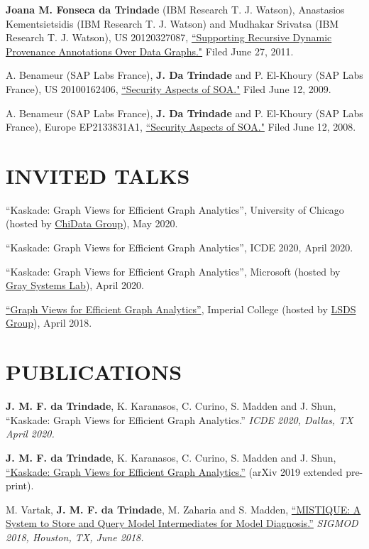 \documentclass[line,margin]{res}
\begin{document}
\begin{resume}
\textbf{Joana M. Fonseca da Trindade} (IBM Research T. J. Watson), Anastasios Kementsietsidis (IBM Research T. J. Watson) and Mudhakar Srivatsa (IBM Research T. J. Watson), US 20120327087, \href{http://www.faqs.org/patents/app/20120327087}{``Supporting Recursive Dynamic Provenance Annotations Over Data Graphs."} Filed June 27, 2011.

A. Benameur (SAP Labs France), \textbf{J. Da Trindade} and P. El-Khoury (SAP Labs France), US 20100162406, \href{http://www.faqs.org/patents/app/20100162406}{``Security Aspects of SOA."}  Filed June 12, 2009.

A. Benameur (SAP Labs France), \textbf{J. Da Trindade} and P. El-Khoury (SAP Labs France), Europe EP2133831A1, \href{http://www.freepatentsonline.com/EP2133831B1.html}{``Security Aspects of SOA."}  Filed June 12, 2008.


\section{INVITED TALKS}
``Kaskade: Graph Views for Efficient Graph Analytics'', University of Chicago (hosted by \href{https://data.cs.uchicago.edu/}{ChiData Group}), May 2020.

``Kaskade: Graph Views for Efficient Graph Analytics'', ICDE 2020, April 2020.

``Kaskade: Graph Views for Efficient Graph Analytics'', Microsoft (hosted by \href{https://azuredata.microsoft.com}{Gray Systems Lab}), April 2020.

\href{http://lsds.doc.ic.ac.uk/content/graph-views-efficient-graph-analytics-collaboration-microsoft-cisl}{``Graph Views for Efficient Graph Analytics''}, Imperial College (hosted by \href{https://lsds.doi.ic.ac.uk}{LSDS Group}), April 2018.


\section{PUBLICATIONS}
\textbf{J. M. F. da Trindade}, K. Karanasos, C. Curino, S. Madden and J. Shun, ``Kaskade: Graph Views for Efficient Graph Analytics.'' \textit{ICDE 2020, Dallas, TX April 2020.}

\textbf{J. M. F. da Trindade}, K. Karanasos, C. Curino, S. Madden and J. Shun, \href{https://arxiv.org/abs/1906.05162}{``Kaskade: Graph Views for Efficient Graph Analytics.''} (arXiv 2019 extended pre-print).

M. Vartak, \textbf{J. M. F. da Trindade}, M. Zaharia and S. Madden, \href{https://cs.stanford.edu/~matei/papers/2018/sigmod_mistique.pdf}{``MISTIQUE: A System to Store and Query Model Intermediates for Model Diagnosis.''} \textit{SIGMOD 2018, Houston, TX, June 2018.}


\end{resume}
\end{document}
